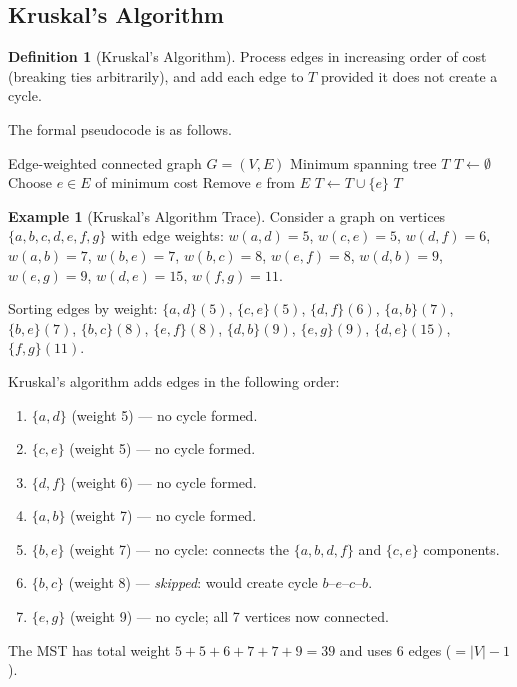 \documentclass[11pt, a4paper, notitlepage]{report}
\theoremstyle{definition}
\newtheorem{definition}[theorem]{Definition}
\newtheorem{example}[theorem]{Example}
\theoremstyle{remark}
\begin{document}
\subsection{Kruskal's Algorithm}
\label{subsec:kruskal}

\begin{definition}[Kruskal's Algorithm]
\label{def:kruskal}
Process edges in increasing order of cost (breaking ties arbitrarily), and add each edge to $T$ provided it does not create a cycle.
\end{definition}

The formal pseudocode is as follows.

\begin{algorithm}[H]
\caption{Kruskal's Algorithm}
\label{alg:kruskal}
\begin{algorithmic}[1]
\Require Edge-weighted connected graph $G = (V, E)$
\Ensure Minimum spanning tree $T$
\State $T \gets \emptyset$
  \State Choose $e \in E$ of minimum cost
  \State Remove $e$ from $E$
    \State $T \gets T \cup \{e\}$
  \EndIf
\EndWhile
\State \Return $T$
\end{algorithmic}
\end{algorithm}

\begin{example}[Kruskal's Algorithm Trace]
\label{ex:kruskal-trace}
Consider a graph on vertices $\{a, b, c, d, e, f, g\}$ with edge weights: $w(a,d)=5$, $w(c,e)=5$, $w(d,f)=6$, $w(a,b)=7$, $w(b,e)=7$, $w(b,c)=8$, $w(e,f)=8$, $w(d,b)=9$, $w(e,g)=9$, $w(d,e)=15$, $w(f,g)=11$.

Sorting edges by weight: $\{a,d\}(5)$, $\{c,e\}(5)$, $\{d,f\}(6)$, $\{a,b\}(7)$, $\{b,e\}(7)$, $\{b,c\}(8)$, $\{e,f\}(8)$, $\{d,b\}(9)$, $\{e,g\}(9)$, $\{d,e\}(15)$, $\{f,g\}(11)$.

Kruskal's algorithm adds edges in the following order:
\begin{enumerate}
  \item $\{a,d\}$ (weight 5) --- no cycle formed.
  \item $\{c,e\}$ (weight 5) --- no cycle formed.
  \item $\{d,f\}$ (weight 6) --- no cycle formed.
  \item $\{a,b\}$ (weight 7) --- no cycle formed.
  \item $\{b,e\}$ (weight 7) --- no cycle: connects the $\{a,b,d,f\}$ and $\{c,e\}$ components.
  \item $\{b,c\}$ (weight 8) --- \emph{skipped}: would create cycle $b$--$e$--$c$--$b$.
  \item $\{e,g\}$ (weight 9) --- no cycle; all 7 vertices now connected.
\end{enumerate}
The MST has total weight $5+5+6+7+7+9 = 39$ and uses 6 edges ($= |V|-1$).
\end{example}
\end{document}
